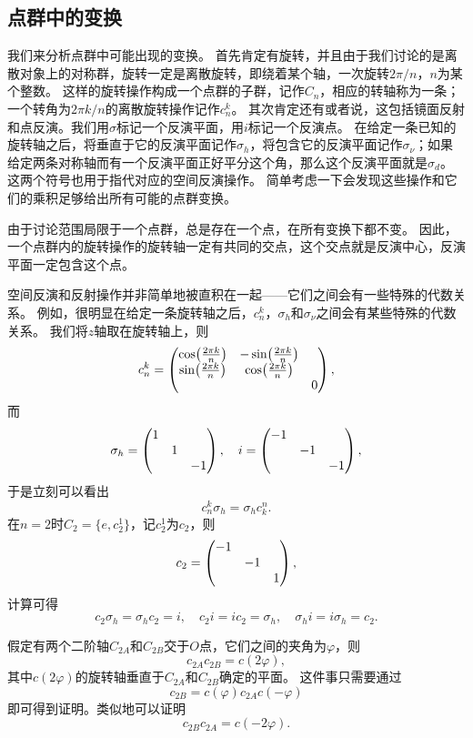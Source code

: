 \subsection{点群中的变换}

我们来分析点群中可能出现的变换。
首先肯定有旋转，并且由于我们讨论的是离散对象上的对称群，旋转一定是离散旋转，即绕着某个轴，一次旋转$2\pi / n$，$n$为某个整数。
这样的旋转操作构成一个点群的子群，记作$C_{n}$，相应的转轴称为一条；一个转角为$2\pi k / n$的离散旋转操作记作$c_n^k$。
其次肯定还有或者说，这包括镜面反射和点反演。我们用$\sigma$标记一个反演平面，用$i$标记一个反演点。
在给定一条已知的旋转轴之后，将垂直于它的反演平面记作$\sigma_h$，将包含它的反演平面记作$\sigma_\nu$；如果给定两条对称轴而有一个反演平面正好平分这个角，那么这个反演平面就是$\sigma_d$。
这两个符号也用于指代对应的空间反演操作。
简单考虑一下会发现这些操作和它们的乘积足够给出所有可能的点群变换。

由于讨论范围局限于一个点群，总是存在一个点，在所有变换下都不变。
因此，一个点群内的旋转操作的旋转轴一定有共同的交点，这个交点就是反演中心，反演平面一定包含这个点。

空间反演和反射操作并非简单地被直积在一起——它们之间会有一些特殊的代数关系。
例如，很明显在给定一条旋转轴之后，$c_n^k$，$\sigma_h$和$\sigma_\nu$之间会有某些特殊的代数关系。
我们将$z$轴取在旋转轴上，则
\begin{equation}
    c_n^k = \pmqty{\dmat{ \cos(\frac{2\pi k}{n}) & -\sin(\frac{2\pi k}{n}) \\ \sin(\frac{2\pi k}{n}) & \cos(\frac{2\pi k}{n}), 0 }},
\end{equation}
而
\begin{equation}
    \sigma_h = \pmqty{\dmat{1, 1, -1}}, \quad i = \pmqty{\dmat{-1, -1, -1}},
\end{equation}
于是立刻可以看出
\begin{equation}
    c_n^k \sigma_h = \sigma_h c^n_k.
\end{equation}
在$n=2$时$C_2=\{e, c^1_2\}$，记$c^1_2$为$c_2$，则
\begin{equation}
    c_2 = \pmqty{\dmat{-1, -1, 1}},
\end{equation}
计算可得
\begin{equation}
    c_2 \sigma_h = \sigma_h c_2 = i, \quad c_2 i = i c_2 = \sigma_h, \quad \sigma_h i = i \sigma_h = c_2.
    \label{eq:sigma-c-i}
\end{equation}

假定有两个二阶轴$C_{2A}$和$C_{2B}$交于$O$点，它们之间的夹角为$\varphi$，则
\begin{equation}
    c_{2A} c_{2B} = c(2\varphi),
\end{equation}
其中$c(2\varphi)$的旋转轴垂直于$C_{2A}$和$C_{2B}$确定的平面。
这件事只需要通过
\begin{equation}
    c_{2B} = c(\varphi) c_{2A} c(-\varphi)
    \label{eq:ab-axis-phi-rotation}
\end{equation}
即可得到证明。类似地可以证明
\begin{equation}
    c_{2B} c_{2A} = c(-2\varphi).
    \label{eq:cb-ca-phi-axis}
\end{equation}

